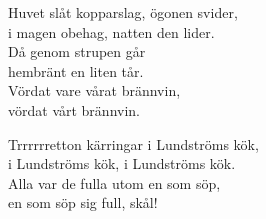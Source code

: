\documentclass[a6paper,10pt]{article}
\begin{document}
\newpage
\setlength{\oddsidemargin}{-0.47in}
\noindent
\begin{center}
\end{center}
\begin{lyrics}
Huvet slåt kopparslag, ögonen svider,\\
i magen obehag, natten den lider.\\
Då genom strupen går\\
hembränt en liten tår.\\
Vördat vare vårat brännvin,\\
vördat vårt brännvin.
\end{lyrics}
\vspace{40pt}
\begin{center}
\end{center}
\begin{lyrics}
Trrrrrretton kärringar i Lundströms kök, \\
i Lundströms kök, i Lundströms kök. \\
Alla var de fulla utom en som söp, \\
en som söp sig full, skål! 
\end{lyrics}
\end{document}
